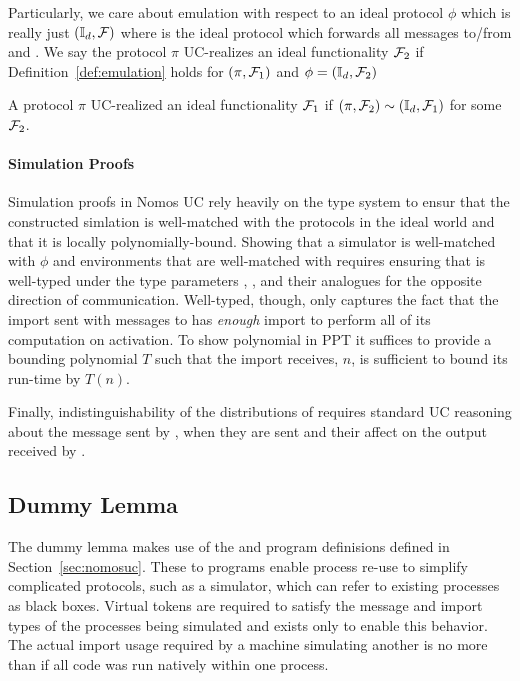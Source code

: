 Particularly, we care about emulation with respect to an ideal protocol $\phi$ which is really just $(\mathbb{I}_d, \mathcal{F})$ where \idealP is the ideal protocol which forwards all messages to/from \Environment and \F.
We say the protocol $\pi$ UC-realizes an ideal functionality $\mathcal{F}_2$ if Definition~\ref{def:emulation} holds for $(\pi, \mathcal{F}_1)$ and  $\phi = (\mathbb{I}_d, \mathcal{F}_2)$

\begin{definition}[UC-Realize]
A protocol $\pi$ UC-realized an ideal functionality $\mathcal{F}_1$ if $(\pi, \mathcal{F}_2) \sim (\mathbb{I}_d, \mathcal{F}_1)$ for some $\mathcal{F}_2$.
\end{definition}

\paragraph{Simulation Proofs}
Simulation proofs in Nomos UC rely heavily on the type system to ensur that the constructed simlation is well-matched with the protocols in the ideal world and that it is locally polynomially-bound.
Showing that a simulator is well-matched with $\phi$ and environments \Environment that are well-matched with \Adversary requires ensuring that \Simulator is well-typed under the type parameters , ,  and their analogues for the opposite direction of communication. 
Well-typed, though, only captures the fact that the import sent with messages to \Simulator has \textit{enough} import to perform all of its computation on activation. 
To show  polynomial in PPT it suffices to provide a bounding polynomial $T$ such that the import \Simulator receives, $n$, is sufficient to bound its run-time by $T(n)$. 

Finally, indistinguishability of the distributions of  requires standard UC reasoning about the message sent by \Simulator, when they are sent and their affect on the output received by \Environment.

\subsection{Dummy Lemma}
The dummy lemma makes use of the  and  program definisions defined in Section~\ref{sec:nomosuc}.
These to programs enable process re-use to simplify complicated protocols, such as a simulator, which can refer to existing processes as black boxes.
Virtual tokens are required to satisfy the message and import types of the processes being simulated and exists only to enable this behavior.
The actual import usage required by a machine simulating another is no more than if all code was run natively within one process.


